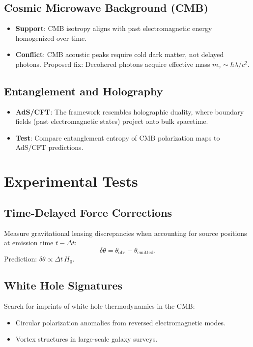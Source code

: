 \documentclass{article}
\begin{document}
\subsection{Cosmic Microwave Background (CMB)}
\begin{itemize}
    \item \textbf{Support}: CMB isotropy aligns with past electromagnetic energy homogenized over time.
    \item \textbf{Conflict}: CMB acoustic peaks require cold dark matter, not delayed photons. Proposed fix: Decohered photons acquire effective mass \( m_{\gamma} \sim \hbar \lambda / c^2 \).
\end{itemize}

\subsection{Entanglement and Holography}
\begin{itemize}
    \item \textbf{AdS/CFT}: The framework resembles holographic duality, where boundary fields (past electromagnetic states) project onto bulk spacetime.
    \item \textbf{Test}: Compare entanglement entropy of CMB polarization maps to AdS/CFT predictions.
\end{itemize}

\section{Experimental Tests}
\subsection{Time-Delayed Force Corrections}
Measure gravitational lensing discrepancies when accounting for source positions at emission time \( t - \Delta t \):
\[
\delta \theta = \theta_{\text{obs}} - \theta_{\text{emitted}}.
\]
Prediction: \( \delta \theta \propto \Delta t \, H_0 \).

\subsection{White Hole Signatures}
Search for imprints of white hole thermodynamics in the CMB:
\begin{itemize}
    \item Circular polarization anomalies from reversed electromagnetic modes.
    \item Vortex structures in large-scale galaxy surveys.
\end{itemize}
\end{document}
